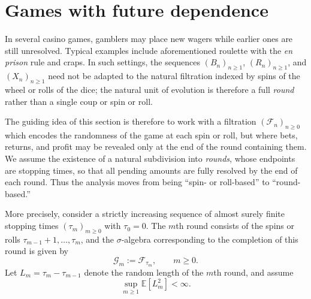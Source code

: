 \documentclass{article}
\theoremstyle{definition}
\theoremstyle{remark}
\newcommand{\E}{\mathbb{E}}
\newcommand{\F}{\mathscr{F}}
\newcommand{\G}{\mathscr{G}}
\begin{document}
\section{Games with future dependence}\label{sec:future-dependence}


In several casino games, gamblers may place new wagers while earlier ones are still unresolved.  
Typical examples include aforementioned roulette with the \textit{en prison} rule and craps.  
In such settings, the sequences $(B_n)_{n\ge1}$, $(R_n)_{n\ge1}$, and $(X_n)_{n\ge1}$ need not be adapted to the natural filtration indexed by spins of the wheel or rolls of the dice; the natural unit of evolution is therefore a full \textit{round} rather than a single coup or spin or roll.

The guiding idea of this section is therefore to work with a filtration $(\F_n)_{n\ge0}$ which encodes the randomness of the game at each spin or roll, but where bets, returns, and profit may be revealed only at the end of the round containing them.  
We assume the existence of a natural subdivision into \textit{rounds}, whose endpoints are stopping times, so that all pending amounts are fully resolved by the end of each round.  
Thus the analysis moves from being ``spin- or roll-based'' to ``round-based.''

More precisely, consider a strictly increasing sequence of almost surely finite stopping times $(\tau_m)_{m\ge0}$ with $\tau_0=0$.  
The $m$th round consists of the spins or rolls $\tau_{m-1}+1,\dots,\tau_m$, and the $\sigma$-algebra corresponding to the completion of this round is given by
\[
\G_m := \F_{\tau_m}, \qquad m\ge0.
\]
Let $L_m=\tau_m-\tau_{m-1}$ denote the random length of the $m$th round, and assume
\[
\sup_{m\ge1}\E[L_m^2]<\infty.
\]
\end{document}
